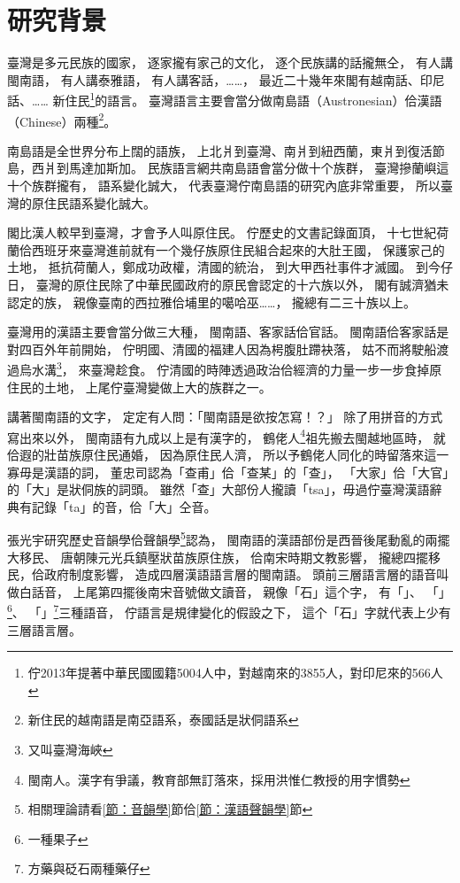 \chapter{研究背景}
\label{章：研究背景}
臺灣是多元民族的國家，
逐家攏有家己的文化，
逐个民族講的話攏無仝，
有人講閩南語，
有人講泰雅語，
有人講客話，……，
最近二十幾年來閣有越南話、印尼話、……
新住民\footnote{佇2013年提著中華民國國籍5004人中，對越南來的3855人，對印尼來的566人\cite{國籍之歸化取得人數}}的語言。
臺灣語言主要會當分做南島語（Austronesian）佮漢語（Chinese）兩種\footnote{新住民的越南語是南亞語系，泰國話是狀侗語系}。

南島語是全世界分布上闊的語族\cite{臺灣原住民史李壬癸}，
上北爿到臺灣、南爿到紐西蘭，東爿到復活節島，西爿到馬達加斯加。
民族語言網\cite{Ethnologue}共南島語會當分做十个族群，
臺灣摻蘭嶼這十个族群攏有，
語系變化誠大，
代表臺灣佇南島語的研究內底非常重要，
所以臺灣的原住民語系變化誠大。

閣比漢人較早到臺灣，才會予人叫原住民。
佇歷史的文書記錄面頂，
十七世紀荷蘭佮西班牙來臺灣進前就有一个幾仔族原住民組合起來的大肚王國\cite{中研院民族所數位典藏大肚番王傳奇}，
保護家己的土地，
抵抗荷蘭人，鄭成功政權，清國的統治，
到大甲西社事件才滅國。
到今仔日，
臺灣的原住民除了中華民國政府的原民會認定的十六族以外，
閣有誠濟猶未認定的族，
親像臺南的西拉雅佮埔里的噶哈巫……，
攏總有二三十族以上。

臺灣用的漢語主要會當分做三大種，
閩南語、客家話佮官話\cite{外省族群的母語與國語}。
閩南語佮客家話是對四百外年前開始，
佇明國、清國的福建人因為枵腹肚蹛袂落，
姑不而將駛船渡過烏水溝\footnote{又叫臺灣海峽}，
來臺灣趁食。
佇清國的時陣透過政治佮經濟的力量一步一步食掉原住民的土地，
上尾佇臺灣變做上大的族群之一。

講著閩南語的文字，
定定有人問：「閩南語是欲按怎寫！？」
除了用拼音的方式寫出來以外，
閩南語有九成以上是有漢字的\cite{洪惟仁閩南語九成有漢字}，
鶴佬人\footnote{閩南人。漢字有爭議，教育部無訂落來，採用洪惟仁教授的用字慣勢}祖先搬去閩越地區時，
就佮遐的壯苗族原住民通婚，
因為原住民人濟，
所以予鶴佬人同化的時留落來這一寡毋是漢語的詞，
董忠司\cite{董忠司非漢語初探}認為「查甫」佮「查某」的「查」，
「大家」佮「大官」的「大」是狀侗族的詞頭。
雖然「查」大部份人攏讀「tsa」，毋過佇臺灣漢語辭典\cite{臺灣漢語辭典}有記錄「ta」的音，佮「大」仝音。

張光宇\cite{閩客方言史稿}研究歷史音韻學佮聲韻學\footnote{相關理論請看\ref{節：音韻學}節佮\ref{節：漢語聲韻學}節}認為，
閩南語的漢語部份是西晉後尾動亂的兩擺大移民、
唐朝陳元光兵鎮壓狀苗族原住族，
佮南宋時期文教影響，
攏總四擺移民，佮政府制度影響，
造成四層漢語語言層的閩南語。
頭前三層語言層的語音叫做白話音，
上尾第四擺後南宋音號做文讀音，
親像「石」這个字，
有「」、
「」\footnote{一種果子}、
「」\footnote{方藥與砭石兩種藥仔}三種語音，
佇語言是規律變化的假設之下，
這个「石」字就代表上少有三層語言層。

